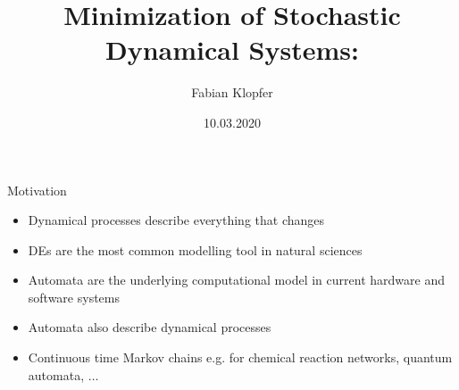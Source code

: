 \documentclass[rgb]{beamer}
\title{Minimization of Stochastic Dynamical Systems:}
\author{Fabian Klopfer}
\date{10.03.2020}
\institute{Modelling of Complex Self-Organizing Systems Group}
\begin{document}
    \begin{frame}
        \titlepage
    \end{frame}

    \begin{frame}{Motivation}
     \begin{itemize}
      \item Dynamical processes describe everything that changes
      \item DEs are the most common modelling tool in natural sciences
      \item Automata are the underlying computational model in current hardware and software systems
      \item Automata also describe dynamical processes
      \item Continuous time Markov chains e.g. for chemical reaction networks, quantum automata, $\dots$
     \end{itemize}
    \end{frame}
    
\end{document}
